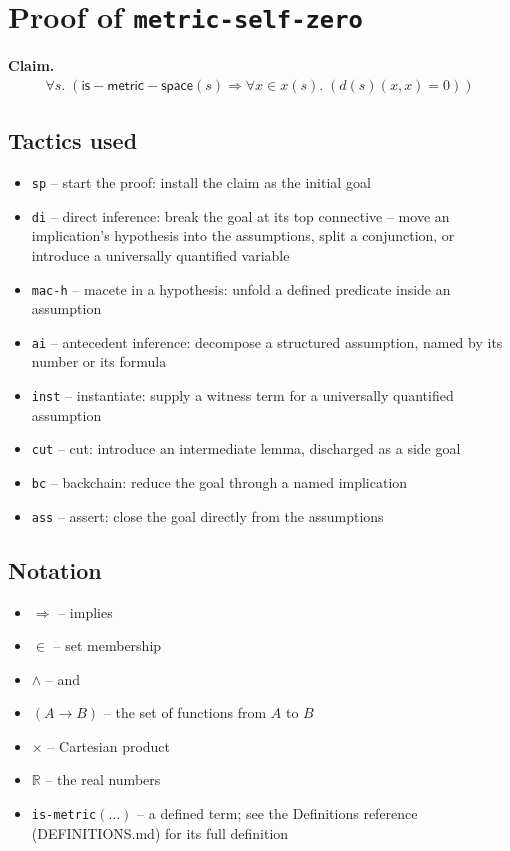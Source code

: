 \documentclass[11pt]{article}
\begin{document}
\section*{Proof of \texttt{metric-self-zero}}
\textbf{Claim.}
\begin{align*}
  \forall s.\; (\mathsf{is{-}metric{-}space}(s) \Rightarrow \forall x \in x(s).\; (d(s)(x, x) = 0))
\end{align*}
\bigskip

\subsection*{Tactics used}
\begin{itemize}
\item \texttt{sp} -- start the proof: install the claim as the initial goal
\item \texttt{di} -- direct inference: break the goal at its top connective -- move an implication's hypothesis into the assumptions, split a conjunction, or introduce a universally quantified variable
\item \texttt{mac-h} -- macete in a hypothesis: unfold a defined predicate inside an assumption
\item \texttt{ai} -- antecedent inference: decompose a structured assumption, named by its number or its formula
\item \texttt{inst} -- instantiate: supply a witness term for a universally quantified assumption
\item \texttt{cut} -- cut: introduce an intermediate lemma, discharged as a side goal
\item \texttt{bc} -- backchain: reduce the goal through a named implication
\item \texttt{ass} -- assert: close the goal directly from the assumptions
\end{itemize}

\subsection*{Notation}
\begin{itemize}
\item $\Rightarrow$ -- implies
\item $\in$ -- set membership
\item $\wedge$ -- and
\item $(A \to B)$ -- the set of functions from $A$ to $B$
\item $\times$ -- Cartesian product
\item $\mathbb{R}$ -- the real numbers
\item \texttt{is-metric}$(\ldots)$ -- a defined term; see the Definitions reference (DEFINITIONS.md) for its full definition
\end{itemize}
\end{document}
